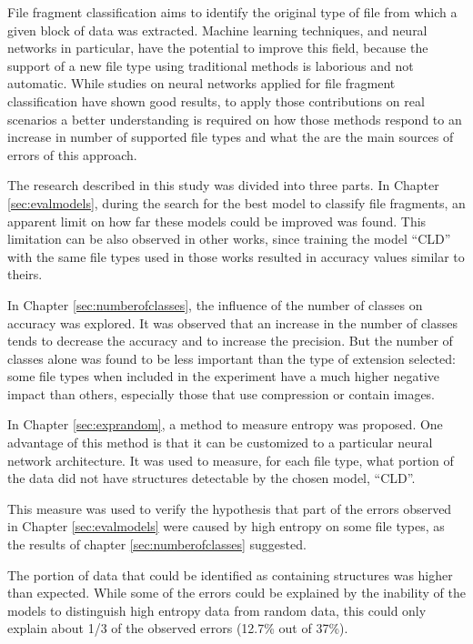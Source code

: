 {\color{red}
File fragment classification aims to identify the original type of file from which a given block of
data was extracted. Machine learning techniques, and neural networks in particular, have the potential to improve this field, because the support of a new file type using traditional methods is laborious and not automatic. While studies on neural networks applied for file fragment classification have shown good results, to apply those contributions on real scenarios a better understanding is required on how those methods respond to an increase in number of supported file types and what the are the main sources of errors of this approach.
}

The research described in this study was divided into three parts.
In Chapter \ref{sec:evalmodels}, during the search for the best model to classify file fragments, an apparent limit on how far these models could be improved was found. This limitation can be also observed in other works, since training the model ``CLD'' with the same file types used in those works resulted in accuracy values similar to theirs.

In Chapter \ref{sec:numberofclasses}, the influence of the number of classes on accuracy was explored. It was observed that an increase in the number of classes tends to decrease the accuracy and to increase the precision. But the number of classes alone was found to be less important than the type of extension selected: some file types when included in the experiment have a much higher negative impact than others, especially those that use compression or contain images.

In Chapter \ref{sec:exprandom}, a method to measure entropy was proposed. One advantage of this method is that it can be customized to a particular neural network architecture. It was used to measure, for each file type, what portion of the data did not have structures detectable by the chosen model, ``CLD''.

This measure was used to verify the hypothesis that part of the errors observed in Chapter \ref{sec:evalmodels} were caused by high entropy on some file types, as the results of chapter  \ref{sec:numberofclasses} suggested.

The portion of data that could be identified as containing structures was higher than expected. While some of the errors could be explained by the inability of the models to distinguish  high entropy data from random data, this could only explain about 1/3 of the observed errors (12.7\% out of 37\%).

